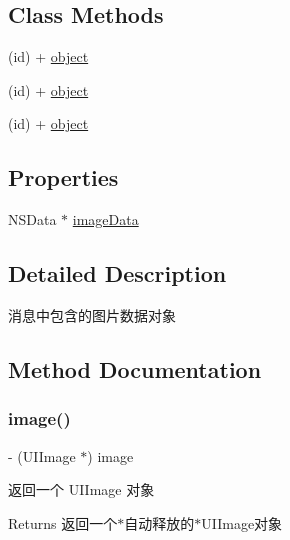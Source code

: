 \subsection*{Class Methods}
\begin{DoxyCompactItemize}
\item 
(id) + \mbox{\hyperlink{interface_w_b_image_object_abbfcbcca8af541d7f42fe670df3507cc}{object}}
\item 
(id) + \mbox{\hyperlink{interface_w_b_image_object_abbfcbcca8af541d7f42fe670df3507cc}{object}}
\item 
(id) + \mbox{\hyperlink{interface_w_b_image_object_abbfcbcca8af541d7f42fe670df3507cc}{object}}
\end{DoxyCompactItemize}
\subsection*{Properties}
\begin{DoxyCompactItemize}
\item 
N\+S\+Data $\ast$ \mbox{\hyperlink{interface_w_b_image_object_a9eda5041875f4bce31255b301a56668a}{image\+Data}}
\end{DoxyCompactItemize}


\subsection{Detailed Description}
消息中包含的图片数据对象 

\subsection{Method Documentation}
\mbox{\label{interface_w_b_image_object_a0e4303982ee2db332462c93f48805f2d}} 
\subsubsection{\texorpdfstring{image()}{image()}\hspace{0.1cm}{\footnotesize\ttfamily [1/3]}}
{\footnotesize\ttfamily -\/ (U\+I\+Image $\ast$) image \begin{DoxyParamCaption}{ }\end{DoxyParamCaption}}

返回一个 U\+I\+Image 对象

\begin{DoxyReturn}{Returns}
返回一个$\ast$自动释放的$\ast$\+U\+I\+Image对象 
\end{DoxyReturn}
\mbox{\label{interface_w_b_image_object_a0e4303982ee2db332462c93f48805f2d}} 
